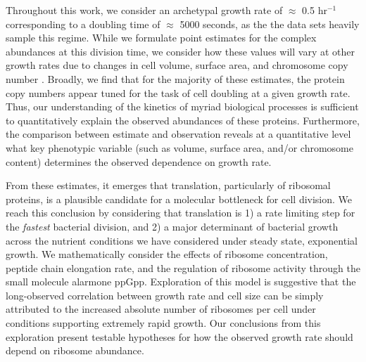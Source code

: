 Throughout this work, we consider an archetypal growth rate of $\approx$ 0.5
hr$^{-1}$ corresponding to a doubling time of $\approx$ 5000 seconds, as the the
data sets heavily sample this regime. While we formulate point estimates for the
complex abundances at this division time, we consider how these values will vary
at other growth rates due to changes in cell volume, surface area, and chromosome
copy number \citep{taheriaraghi2015}. Broadly, we find that for the majority of
these estimates, the protein copy numbers appear tuned for the task of cell
doubling at a given growth rate. Thus, our understanding of the kinetics of
myriad biological processes is sufficient to quantitatively explain the
observed abundances of these proteins. Furthermore, the comparison between
estimate and observation reveals at a quantitative level what key phenotypic
variable (such as volume, surface area, and/or chromosome content) determines
the observed dependence on growth rate.

From these estimates, it emerges that translation, particularly of ribosomal
proteins, is a plausible candidate for a molecular bottleneck for cell division.
We reach this conclusion by considering that translation is 1) a rate limiting
step for the \textit{fastest} bacterial division, and 2) a major determinant
of bacterial growth across the nutrient conditions we have considered under
steady state, exponential growth. We mathematically consider the effects of ribosome
concentration, peptide chain elongation rate, and the regulation of ribosome
activity through the small molecule alarmone ppGpp. Exploration of this model is
suggestive that the long-observed correlation between growth rate and cell size
\citep{schaechter1958, si2017} can be simply attributed to the increased
absolute number of ribosomes per cell under conditions supporting extremely
rapid growth. Our conclusions from this exploration present testable 
hypotheses for how the observed growth rate should depend on ribosome abundance.



